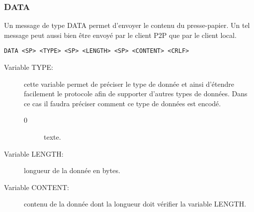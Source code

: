 \hrulefill

\subsubsection*{DATA}
Un message de type DATA permet d'envoyer le contenu du presse-papier. Un tel
message peut aussi bien être envoyé par le client P2P que par le client local.
\begin{verbatim}
DATA <SP> <TYPE> <SP> <LENGTH> <SP> <CONTENT> <CRLF>
\end{verbatim}
\begin{description}
\item[Variable TYPE:] cette variable permet de préciser le type
  de donnée et ainsi d'étendre facilement le protocole afin de supporter
  d'autres types de données. Dans ce cas il faudra préciser comment ce type
  de données est encodé.
  \begin{description}
  \item[0] texte.
  \end{description}
\item[Variable LENGTH:] longueur de la donnée en bytes.
\item[Variable CONTENT:] contenu de la donnée dont la longueur
  doit vérifier la variable LENGTH.
\end{description}
